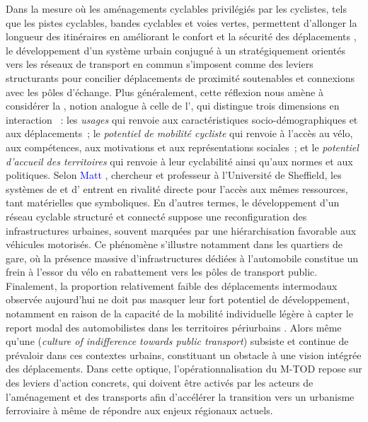 \begin{refsegment}
Dans la mesure où les aménagements cyclables privilégiés par les cyclistes, tels que les pistes cyclables, bandes cyclables et voies vertes, permettent d’allonger la longueur des itinéraires en améliorant le confort et la sécurité des déplacements \textcolor{blue}{\autocite{poisson_amenagements_2019}}, le développement d'un système urbain conjugué à un  stratégiquement orientés vers les réseaux de transport en commun s’imposent comme des leviers structurants pour concilier déplacements de proximité soutenables et connexions avec les pôles d’échange. Plus généralement, cette réflexion nous amène à considérer la , notion analogue à celle de l’, qui distingue trois dimensions en interaction \textcolor{blue}{\autocite[20-21]{rerat_au_2019}}~: les \textsl{usages} qui renvoie aux caractéristiques socio-démographiques et aux déplacements~; le \textsl{potentiel de mobilité cycliste} qui renvoie à l'accès au vélo, aux compétences, aux motivations et aux représentations sociales~; et le \textsl{potentiel d'accueil des territoires} qui renvoie à leur cyclabilité ainsi qu'aux normes et aux politiques. Selon \textcolor{blue}{Matt} \textcolor{blue}{\textcite[492]{watson_how_2012}}, chercheur et professeur à l'Université de Sheffield, les systèmes de  et d' entrent en rivalité directe pour l’accès aux mêmes ressources, tant matérielles que symboliques. En d’autres termes, le développement d’un réseau cyclable structuré et connecté suppose une reconfiguration des infrastructures urbaines, souvent marquées par une hiérarchisation favorable aux véhicules motorisés. Ce phénomène s’illustre notamment dans les quartiers de gare, où la présence massive d’infrastructures dédiées à l’automobile constitue un frein à l’essor du vélo en rabattement vers les pôles de transport public. Finalement, la proportion relativement faible des déplacements intermodaux observée aujourd’hui ne doit pas masquer leur fort potentiel de développement, notamment en raison de la capacité de la mobilité individuelle légère à capter le report modal des automobilistes dans les territoires périurbains \textcolor{blue}{\autocite[22]{ulles_quelle_2024}}. Alors même qu'une  (\textsl{culture of indifference towards public transport}) subsiste et continue de prévaloir \textcolor{blue}{\autocite[656]{tan_identifying_2014}} dans ces contextes urbains, constituant un obstacle à une vision intégrée des déplacements. Dans cette optique, l’opérationnalisation du \acrshort{M-TOD} repose sur des leviers d’action concrets, qui doivent être activés par les acteurs de l’aménagement et des transports afin d’accélérer la transition vers un urbanisme ferroviaire à même de répondre aux enjeux régionaux actuels.%


\end{refsegment}
